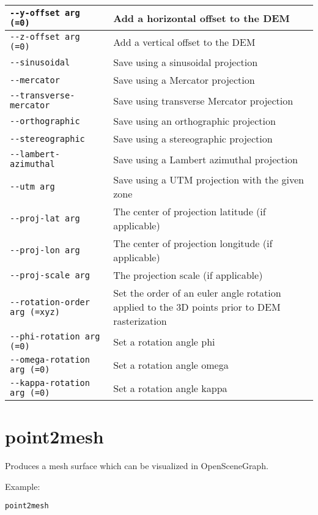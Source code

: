\begin{longtable}{|l|p{10cm}|}
\verb#--y-offset arg (=0)# & Add a horizontal offset to the DEM \\ \hline
\verb#--z-offset arg (=0)# & Add a vertical offset to the DEM \\ \hline
\verb#--sinusoidal# & Save using a sinusoidal projection \\ \hline
\verb#--mercator# & Save using a Mercator projection \\ \hline
\verb#--transverse-mercator# & Save using transverse Mercator projection \\ \hline
\verb#--orthographic# & Save using an orthographic projection \\ \hline
\verb#--stereographic# & Save using a stereographic projection \\ \hline
\verb#--lambert-azimuthal# & Save using a Lambert azimuthal projection \\ \hline
\verb#--utm arg# & Save using a UTM projection with the given zone \\ \hline
\verb#--proj-lat arg# & The center of projection latitude (if applicable) \\ \hline
\verb#--proj-lon arg# & The center of projection longitude (if applicable) \\ \hline
\verb#--proj-scale arg# & The projection scale (if applicable) \\ \hline
\verb#--rotation-order arg (=xyz)# & Set the order of an euler angle rotation applied to the 3D points prior to DEM rasterization \\ \hline
\verb#--phi-rotation arg (=0)# & Set a rotation angle phi \\ \hline
\verb#--omega-rotation arg (=0)# & Set a rotation angle omega \\ \hline
\verb#--kappa-rotation arg (=0)# & Set a rotation angle kappa \\ \hline
\end{longtable}

\section{point2mesh}
\label{point2mesh}

Produces a mesh surface which can be visualized in OpenSceneGraph.

Example:
\begin{verbatim}
point2mesh
\end{verbatim}

